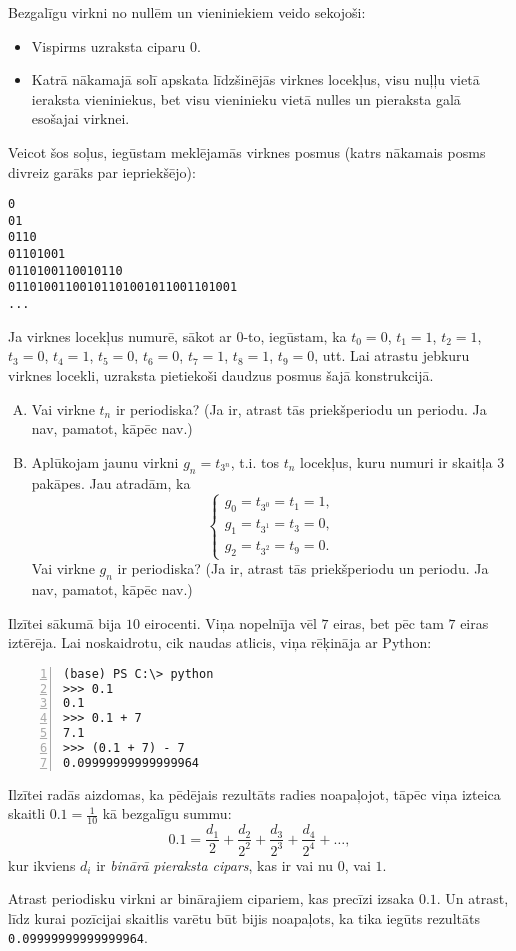 \documentclass[a4paper,12pt]{article}
\begin{document}
\vspace{10pt}
\begin{problem}
Bezgalīgu virkni no nullēm un vieniniekiem veido sekojoši: 
\begin{itemize} 
\item Vispirms uzraksta ciparu $0$. 
\item Katrā nākamajā solī apskata līdzšinējās virknes locekļus, visu nuļļu vietā ieraksta vieniniekus, bet visu vieninieku vietā nulles \textendash{}
un pieraksta galā esošajai virknei. 
\end{itemize}
Veicot šos soļus, iegūstam meklējamās virknes posmus (katrs nākamais posms divreiz garāks par iepriekšējo):
\begin{verbatim}
0
01
0110
01101001
0110100110010110
01101001100101101001011001101001
...
\end{verbatim}
Ja virknes locekļus numurē, sākot ar $0$-to, iegūstam, ka 
$t_0 = 0$, $t_1 = 1$, $t_2 = 1$, $t_3 = 0$, $t_4 = 1$, $t_5 = 0$, $t_6 = 0$, $t_7 = 1$, 
$t_8 = 1$, $t_9 = 0$, utt. Lai atrastu jebkuru virknes locekli, uzraksta pietiekoši 
daudzus posmus šajā konstrukcijā. 
\begin{enumerate}[(A)]
\item Vai virkne $t_n$ ir periodiska? (Ja ir, atrast tās priekšperiodu un periodu. Ja nav, pamatot, kāpēc nav.)
\item Aplūkojam jaunu virkni ${\displaystyle g_n = t_{3^n}}$, t.i. tos $t_n$ locekļus, kuru numuri ir skaitļa $3$ pakāpes. 
Jau atradām, ka 
$$\left\{ \begin{array}{l}
g_0 = t_{3^0} = t_1 = 1,\\
g_1 = t_{3^1} =  t_3 = 0,\\
g_2 = t_{3^2} = t_9 = 0. 
\end{array} \right.$$
Vai virkne $g_n$ ir periodiska? (Ja ir, atrast tās priekšperiodu un periodu. Ja nav, pamatot, kāpēc nav.)
\end{enumerate}
\end{problem}



\vspace{10pt}
\begin{problem}
Ilzītei sākumā bija $10$ eirocenti. Viņa nopelnīja vēl $7$ eiras, bet pēc tam $7$ eiras iztērēja. 
Lai noskaidrotu, cik naudas atlicis, viņa rēķināja ar Python:
\begin{Verbatim}[frame=single,numbers=left]
(base) PS C:\> python
>>> 0.1
0.1
>>> 0.1 + 7
7.1
>>> (0.1 + 7) - 7
0.09999999999999964
\end{Verbatim}
Ilzītei radās aizdomas, ka pēdējais rezultāts radies noapaļojot, 
tāpēc viņa izteica skaitli $0.1 = \frac{1}{10}$ kā bezgalīgu summu:
$$0.1 = \frac{d_1}{2} + \frac{d_2}{2^2} + \frac{d_3}{2^3} + \frac{d_4}{2^4} + \ldots,$$
kur ikviens $d_i$ ir {\em binārā pieraksta cipars}, kas ir vai nu $0$, vai $1$. 

Atrast periodisku virkni ar binārajiem cipariem, kas precīzi izsaka $0.1$. Un atrast, 
līdz kurai pozīcijai skaitlis varētu būt bijis noapaļots, ka tika iegūts rezultāts {\tt 0.09999999999999964}. 
\end{problem}
\end{document}
